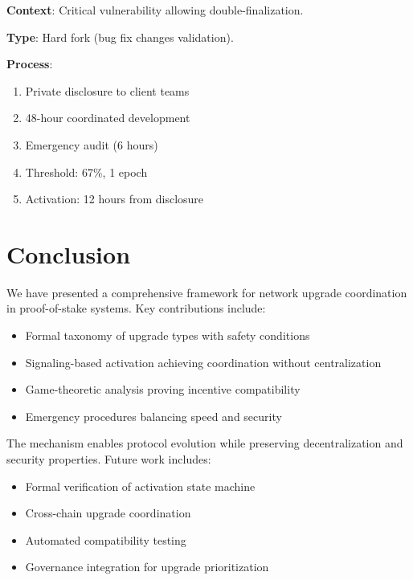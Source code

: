 \documentclass[11pt,a4paper]{article}
\theoremstyle{definition}
\theoremstyle{remark}
\begin{document}
\textbf{Context}: Critical vulnerability allowing double-finalization.

\textbf{Type}: Hard fork (bug fix changes validation).

\textbf{Process}:
\begin{enumerate}
    \item Private disclosure to client teams
    \item 48-hour coordinated development
    \item Emergency audit (6 hours)
    \item Threshold: 67\%, 1 epoch
    \item Activation: 12 hours from disclosure
\end{enumerate}

\section{Conclusion}

We have presented a comprehensive framework for network upgrade coordination in proof-of-stake systems. Key contributions include:

\begin{itemize}
    \item Formal taxonomy of upgrade types with safety conditions
    \item Signaling-based activation achieving coordination without centralization
    \item Game-theoretic analysis proving incentive compatibility
    \item Emergency procedures balancing speed and security
\end{itemize}

The mechanism enables protocol evolution while preserving decentralization and security properties. Future work includes:

\begin{itemize}
    \item Formal verification of activation state machine
    \item Cross-chain upgrade coordination
    \item Automated compatibility testing
    \item Governance integration for upgrade prioritization
\end{itemize}
\end{document}
